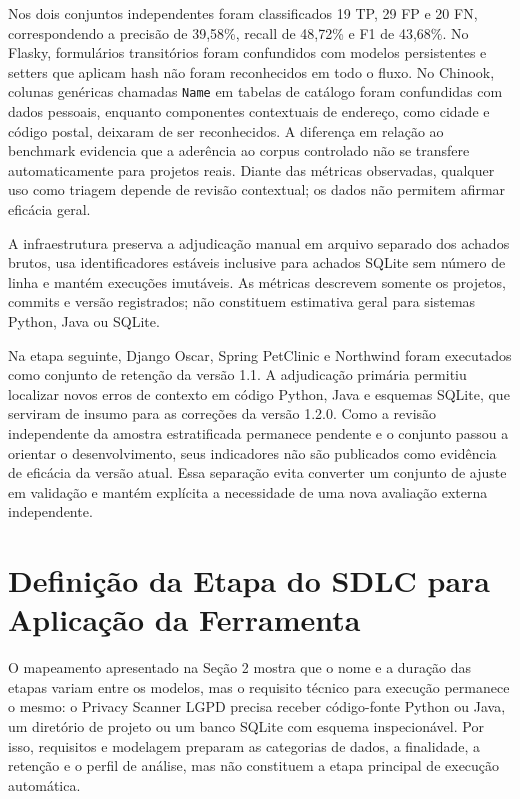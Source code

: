 \documentclass[12pt,a4paper,oneside]{report}
\begin{document}
Nos dois conjuntos independentes foram classificados 19 TP, 29 FP e 20 FN, correspondendo a precisão de 39,58\%, recall de 48,72\% e F1 de 43,68\%. No Flasky, formulários transitórios foram confundidos com modelos persistentes e setters que aplicam hash não foram reconhecidos em todo o fluxo. No Chinook, colunas genéricas chamadas \texttt{Name} em tabelas de catálogo foram confundidas com dados pessoais, enquanto componentes contextuais de endereço, como cidade e código postal, deixaram de ser reconhecidos. A diferença em relação ao benchmark evidencia que a aderência ao corpus controlado não se transfere automaticamente para projetos reais. Diante das métricas observadas, qualquer uso como triagem depende de revisão contextual; os dados não permitem afirmar eficácia geral.

A infraestrutura preserva a adjudicação manual em arquivo separado dos achados brutos, usa identificadores estáveis inclusive para achados SQLite sem número de linha e mantém execuções imutáveis. As métricas descrevem somente os projetos, commits e versão registrados; não constituem estimativa geral para sistemas Python, Java ou SQLite.

Na etapa seguinte, Django Oscar, Spring PetClinic e Northwind foram executados como conjunto de retenção da versão 1.1. A adjudicação primária permitiu localizar novos erros de contexto em código Python, Java e esquemas SQLite, que serviram de insumo para as correções da versão 1.2.0. Como a revisão independente da amostra estratificada permanece pendente e o conjunto passou a orientar o desenvolvimento, seus indicadores não são publicados como evidência de eficácia da versão atual. Essa separação evita converter um conjunto de ajuste em validação e mantém explícita a necessidade de uma nova avaliação externa independente.

\section{Definição da Etapa do SDLC para Aplicação da Ferramenta}

O mapeamento apresentado na Seção 2 mostra que o nome e a duração das etapas variam entre os modelos, mas o requisito técnico para execução permanece o mesmo: o Privacy Scanner LGPD precisa receber código-fonte Python ou Java, um diretório de projeto ou um banco SQLite com esquema inspecionável. Por isso, requisitos e modelagem preparam as categorias de dados, a finalidade, a retenção e o perfil de análise, mas não constituem a etapa principal de execução automática.
\end{document}
